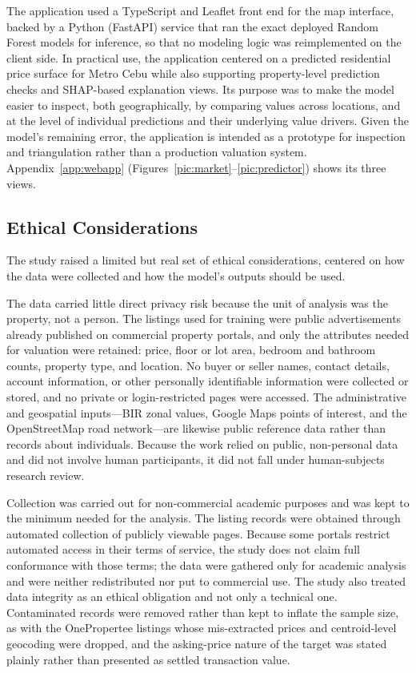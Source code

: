 The application used a TypeScript and Leaflet front end for the map interface, backed by a Python (FastAPI) service that ran the exact deployed Random Forest models for inference, so that no modeling logic was reimplemented on the client side. In practical use, the application centered on a predicted residential price surface for Metro Cebu while also supporting property-level prediction checks and SHAP-based explanation views. Its purpose was to make the model easier to inspect, both geographically, by comparing values across locations, and at the level of individual predictions and their underlying value drivers. Given the model's remaining error, the application is intended as a prototype for inspection and triangulation rather than a production valuation system. Appendix~\ref{app:webapp} (Figures~\ref{pic:market}--\ref{pic:predictor}) shows its three views.

\subsection{Ethical Considerations}\label{ethical-considerations}

The study raised a limited but real set of ethical considerations, centered on how the data were collected and how the model's outputs should be used.

The data carried little direct privacy risk because the unit of analysis was the property, not a person. The listings used for training were public advertisements already published on commercial property portals, and only the attributes needed for valuation were retained: price, floor or lot area, bedroom and bathroom counts, property type, and location. No buyer or seller names, contact details, account information, or other personally identifiable information were collected or stored, and no private or login-restricted pages were accessed. The administrative and geospatial inputs---BIR zonal values, Google Maps points of interest, and the OpenStreetMap road network---are likewise public reference data rather than records about individuals. Because the work relied on public, non-personal data and did not involve human participants, it did not fall under human-subjects research review.

Collection was carried out for non-commercial academic purposes and was kept to the minimum needed for the analysis. The listing records were obtained through automated collection of publicly viewable pages. Because some portals restrict automated access in their terms of service, the study does not claim full conformance with those terms; the data were gathered only for academic analysis and were neither redistributed nor put to commercial use. The study also treated data integrity as an ethical obligation and not only a technical one. Contaminated records were removed rather than kept to inflate the sample size, as with the OnePropertee listings whose mis-extracted prices and centroid-level geocoding were dropped, and the asking-price nature of the target was stated plainly rather than presented as settled transaction value.

